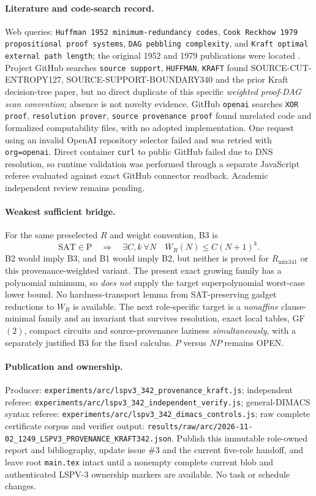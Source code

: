 \documentclass[11pt]{article}
\begin{document}
\paragraph{Literature and code-search record.}
Web queries: \texttt{Huffman 1952 minimum-redundancy codes}, \texttt{Cook Reckhow 1979 propositional proof systems}, \texttt{DAG pebbling complexity}, and \texttt{Kraft optimal external path length}; the original 1952 and 1979 publications were located \cite{Huffman1952,CookReckhow1979}. Project GitHub searches \texttt{source support}, \texttt{HUFFMAN}, \texttt{KRAFT} found SOURCE-CUT-ENTROPY127, SOURCE-SUPPORT-BOUNDARY340 and the prior Kraft decision-tree paper, but no direct duplicate of this specific \emph{weighted proof-DAG scan convention}; absence is not novelty evidence. GitHub \texttt{openai} searches \texttt{XOR proof}, \texttt{resolution prover}, \texttt{source provenance proof} found unrelated code and formalized computability files, with no adopted implementation. One request using an invalid OpenAI repository selector failed and was retried with \texttt{org=openai}. Direct container \texttt{curl} to public GitHub failed due to DNS resolution, so runtime validation was performed through a separate JavaScript referee evaluated against exact GitHub connector readback. Academic independent review remains pending.

\paragraph{Weakest sufficient bridge.}
For the same preselected $R$ and weight convention, B3 is
\[
 \mathrm{SAT}\in\mathrm P\quad\Longrightarrow\quad
 \exists C,k\ \forall N\quad
 \overline W_R(N)\le C(N+1)^k.
\]
B2 would imply B3, and B1 would imply B2, but neither is proved for $R_{\mathrm{mix341}}$ or this provenance-weighted variant. The present exact growing family has a polynomial minimum, so \emph{does not} supply the target superpolynomial worst-case lower bound. No hardness-transport lemma from SAT-preserving gadget reductions to $W_R$ is available. The next role-specific target is a \emph{nonaffine} clause-minimal family and an invariant that survives resolution, exact local tables, GF$(2)$, compact circuits and source-provenance laziness \emph{simultaneously}, with a separately justified B3 for the fixed calculus. $P$ versus $NP$ remains OPEN.

\paragraph{Publication and ownership.}
Producer: \texttt{experiments/arc/lspv3\_342\_provenance\_kraft.js}; independent referee: \texttt{experiments/arc/lspv3\_342\_independent\_verify.js}; general-DIMACS syntax referee: \texttt{experiments/arc/lspv3\_342\_dimacs\_controls.js}; raw complete certificate corpus and verifier output: \texttt{results/raw/arc/2026-11-02\_1249\_LSPV3\_PROVENANCE\_KRAFT342.json}. Publish this immutable role-owned report and bibliography, update issue \#3 and the current five-role handoff, and leave root \texttt{main.tex} intact until a nonempty complete current blob and authenticated LSPV-3 ownership markers are available. No task or schedule changes.


\end{document}
